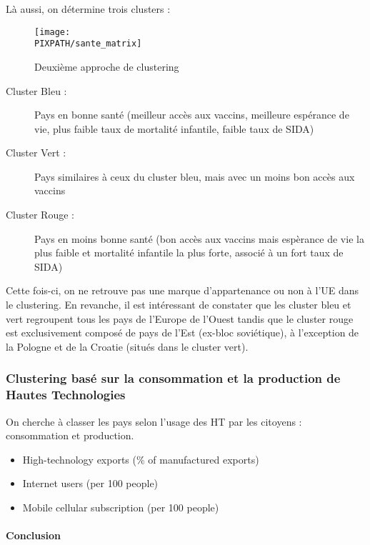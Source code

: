 \begin{description}
Là aussi, on détermine trois clusters :

\begin{sidewaysfigure}[h]
\centering
\caption{Deuxième approche de clustering}
\texttt{[image: \\PIXPATH/sante\_matrix]}
\end{sidewaysfigure}

\begin{description}
\item[Cluster Bleu : ] Pays en bonne santé (meilleur accès aux vaccins, meilleure espérance de vie, plus faible taux de mortalité infantile, faible taux de SIDA)
\item[Cluster Vert : ] Pays similaires à ceux du cluster bleu, mais avec un moins bon accès aux vaccins
\item[Cluster Rouge : ] Pays en moins bonne santé (bon accès aux vaccins mais espèrance de vie la plus faible et mortalité infantile la plus forte, associé à un fort taux de SIDA)
\end{description}

\vskip 6pt

Cette fois-ci, on ne retrouve pas une marque d'appartenance ou non à l'UE dans
le clustering. En revanche, il est intéressant de constater que les cluster bleu
et vert regroupent tous les pays de l'Europe de l'Ouest tandis que le cluster rouge
est exclusivement composé de pays de l'Est (ex-bloc soviétique), à l'exception de
la Pologne et de la Croatie (situés dans le cluster vert).


\subsubsection{Clustering basé sur la consommation et la production de
Hautes Technologies}

On cherche à classer les pays selon l'usage des HT par les citoyens :
consommation et production.

\begin{itemize}
\item High-technology exports (\% of manufactured exports)
\item Internet users (per 100 people)
\item Mobile cellular subscription (per 100 people)
\end{itemize}

\paragraph{Conclusion}\hfill\\


\end{description}
